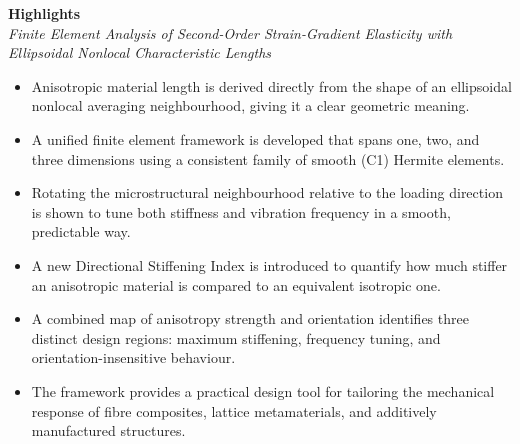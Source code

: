\documentclass[12pt,a4paper]{article}
\begin{document}
\begin{center}
{\Large\bfseries Highlights}\\[4pt]
\textit{Finite Element Analysis of Second-Order Strain-Gradient Elasticity with Ellipsoidal Nonlocal Characteristic Lengths}
\end{center}

\vspace{0.3cm}

\begin{itemize}
\item Anisotropic material length is derived directly from the shape of an ellipsoidal nonlocal averaging neighbourhood, giving it a clear geometric meaning.
\item A unified finite element framework is developed that spans one, two, and three dimensions using a consistent family of smooth (C1) Hermite elements.
\item Rotating the microstructural neighbourhood relative to the loading direction is shown to tune both stiffness and vibration frequency in a smooth, predictable way.
\item A new Directional Stiffening Index is introduced to quantify how much stiffer an anisotropic material is compared to an equivalent isotropic one.
\item A combined map of anisotropy strength and orientation identifies three distinct design regions: maximum stiffening, frequency tuning, and orientation-insensitive behaviour.
\item The framework provides a practical design tool for tailoring the mechanical response of fibre composites, lattice metamaterials, and additively manufactured structures.
\end{itemize}
\end{document}
